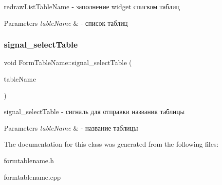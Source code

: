 redraw\+List\+Table\+Name -\/ заполнение widget списком таблиц 


\begin{DoxyParams}{Parameters}
{\em table\+Name} & -\/ список таблиц \\
\hline
\end{DoxyParams}
\mbox{\label{classFormTableName_ae48196d2f0cc732bbe463269884f841a}} 
\subsubsection{\texorpdfstring{signal\+\_\+select\+Table}{signal\_selectTable}}
{\footnotesize\ttfamily void Form\+Table\+Name\+::signal\+\_\+select\+Table (\begin{DoxyParamCaption}\item[{const Q\+String \&}]{table\+Name }\end{DoxyParamCaption})\hspace{0.3cm}{\ttfamily [signal]}}



signal\+\_\+select\+Table -\/ сигналь для отправки названия таблицы 


\begin{DoxyParams}{Parameters}
{\em table\+Name} & -\/ название таблицы \\
\hline
\end{DoxyParams}


The documentation for this class was generated from the following files\+:\begin{DoxyCompactItemize}
\item 
formtablename.\+h\item 
formtablename.\+cpp\end{DoxyCompactItemize}
